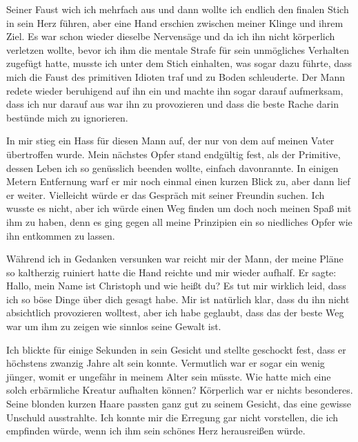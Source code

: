 \documentclass[11pt, a5paper]{article}
\newcommand{\e}{Christoph }
\begin{document}
\begin{spacing}{1.2}
		Seiner Faust wich ich mehrfach aus und dann wollte ich endlich den finalen Stich in sein Herz führen, aber eine Hand erschien zwischen meiner Klinge und ihrem Ziel. Es war schon wieder dieselbe Nervensäge und da ich ihn nicht körperlich verletzen wollte, bevor ich ihm die mentale Strafe für sein unmögliches Verhalten zugefügt hatte, musste ich unter dem Stich einhalten, was sogar dazu führte, dass mich die Faust des primitiven Idioten traf und zu Boden schleuderte. Der Mann redete wieder beruhigend auf ihn ein und machte ihn sogar darauf aufmerksam, dass ich nur darauf aus war ihn zu provozieren und dass die beste Rache darin bestünde mich zu ignorieren.
		
		In mir stieg ein Hass für diesen Mann auf, der nur von dem auf meinen Vater übertroffen wurde. Mein nächstes Opfer stand endgültig fest, als der Primitive, dessen Leben ich so genüsslich beenden wollte, einfach davonrannte. In einigen Metern Entfernung warf er mir noch einmal einen kurzen Blick zu, aber dann lief er weiter. Vielleicht würde er das Gespräch mit seiner Freundin suchen. Ich wusste es nicht, aber ich würde einen Weg finden um doch noch meinen Spaß mit ihm zu haben, denn es ging gegen all meine Prinzipien ein so niedliches Opfer wie ihn entkommen zu lassen.
		
		Während ich in Gedanken versunken war reicht mir der Mann, der meine Pläne so kaltherzig ruiniert hatte die Hand reichte und mir wieder aufhalf. Er sagte: \frqq Hallo, mein Name ist \e und wie heißt du? Es tut mir wirklich leid, dass ich so böse Dinge über dich gesagt habe. Mir ist natürlich klar, dass du ihn nicht absichtlich provozieren wolltest, aber ich habe geglaubt, dass das der beste Weg war um ihm zu zeigen wie sinnlos seine Gewalt ist.\flqq
		
		Ich blickte für einige Sekunden in sein Gesicht und stellte geschockt fest, dass er höchstens zwanzig Jahre alt sein konnte. Vermutlich war er sogar ein wenig jünger, womit er ungefähr in meinem Alter sein müsste. Wie hatte mich eine solch erbärmliche Kreatur aufhalten können? Körperlich war er nichts besonderes. Seine blonden kurzen Haare passten ganz gut zu seinem Gesicht, das eine gewisse Unschuld ausstrahlte. Ich konnte mir die Erregung gar nicht vorstellen, die ich empfinden würde, wenn ich ihm sein schönes Herz herausreißen würde.
		

\end{spacing}
\end{document}
